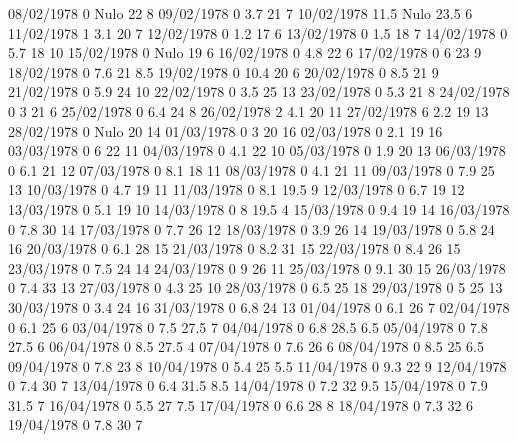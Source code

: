 08/02/1978  0     Nulo    22     8 
09/02/1978  0      3.7    21     7 
10/02/1978  11.5  Nulo    23.5   6 
11/02/1978  1      3.1    20     7 
12/02/1978  0      1.2    17     6 
13/02/1978  0      1.5    18     7 
14/02/1978  0      5.7    18     10 
15/02/1978  0     Nulo    19     6 
16/02/1978  0      4.8    22     6 
17/02/1978  0      6      23     9 
18/02/1978  0      7.6    21     8.5 
19/02/1978  0      10.4   20     6 
20/02/1978  0      8.5    21     9 
21/02/1978  0      5.9    24     10 
22/02/1978  0      3.5    25     13 
23/02/1978  0      5.3    21     8 
24/02/1978  0      3      21     6 
25/02/1978  0      6.4    24     8 
26/02/1978  2      4.1    20     11 
27/02/1978  6      2.2    19     13 
28/02/1978  0     Nulo    20     14 
01/03/1978  0      3      20     16 
02/03/1978  0      2.1    19     16 
03/03/1978  0      6      22     11 
04/03/1978  0      4.1    22     10 
05/03/1978  0      1.9    20     13 
06/03/1978  0      6.1    21     12 
07/03/1978  0      8.1    18     11 
08/03/1978  0      4.1    21     11 
09/03/1978  0      7.9    25     13 
10/03/1978  0      4.7    19     11 
11/03/1978  0      8.1    19.5   9 
12/03/1978  0      6.7    19     12 
13/03/1978  0      5.1    19     10 
14/03/1978  0      8      19.5   4 
15/03/1978  0      9.4    19     14 
16/03/1978  0      7.8    30     14 
17/03/1978  0      7.7    26     12 
18/03/1978  0      3.9    26     14 
19/03/1978  0      5.8    24     16 
20/03/1978  0      6.1    28     15 
21/03/1978  0      8.2    31     15 
22/03/1978  0      8.4    26     15 
23/03/1978  0      7.5    24     14 
24/03/1978  0      9      26     11 
25/03/1978  0      9.1    30     15 
26/03/1978  0      7.4    33     13 
27/03/1978  0      4.3    25     10 
28/03/1978  0      6.5    25     18 
29/03/1978  0      5      25     13 
30/03/1978  0      3.4    24     16 
31/03/1978  0      6.8    24     13 
01/04/1978  0      6.1    26     7 
02/04/1978  0      6.1    25     6 
03/04/1978  0      7.5    27.5   7 
04/04/1978  0      6.8    28.5   6.5 
05/04/1978  0      7.8    27.5   6 
06/04/1978  0      8.5    27.5   4 
07/04/1978  0      7.6    26     6 
08/04/1978  0      8.5    25     6.5 
09/04/1978  0      7.8    23     8 
10/04/1978  0      5.4    25     5.5 
11/04/1978  0      9.3    22     9 
12/04/1978  0      7.4    30     7 
13/04/1978  0      6.4    31.5   8.5 
14/04/1978  0      7.2    32     9.5 
15/04/1978  0      7.9    31.5   7 
16/04/1978  0      5.5    27     7.5 
17/04/1978  0      6.6    28     8 
18/04/1978  0      7.3    32     6 
19/04/1978  0      7.8    30     7 
